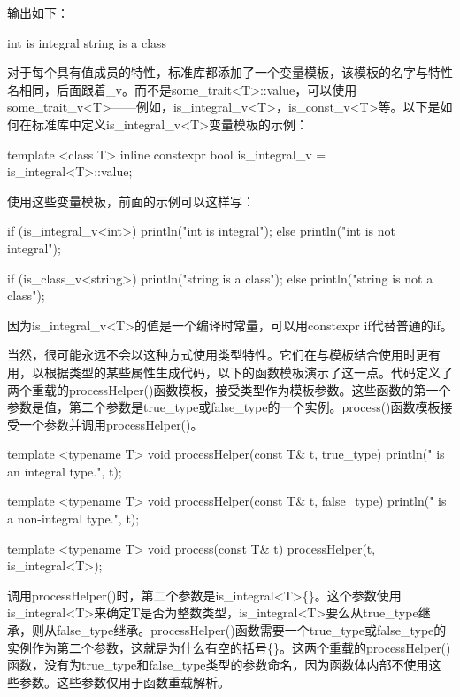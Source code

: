 输出如下：

\begin{shell}
int is integral
string is a class
\end{shell}

对于每个具有值成员的特性，标准库都添加了一个变量模板，该模板的名字与特性名相同，后面跟着\_v。而不是some\_trait<T>::value，可以使用some\_trait\_v<T>——例如，is\_integral\_v<T>，is\_const\_v<T>等。以下是如何在标准库中定义is\_integral\_v<T>变量模板的示例：

\begin{cpp}
template <class T>
inline constexpr bool is_integral_v = is_integral<T>::value;
\end{cpp}

使用这些变量模板，前面的示例可以这样写：

\begin{cpp}
if (is_integral_v<int>) { println("int is integral"); }
else { println("int is not integral"); }

if (is_class_v<string>) { println("string is a class"); }
else { println("string is not a class"); }
\end{cpp}

因为is\_integral\_v<T>的值是一个编译时常量，可以用constexpr if代替普通的if。

当然，很可能永远不会以这种方式使用类型特性。它们在与模板结合使用时更有用，以根据类型的某些属性生成代码，以下的函数模板演示了这一点。代码定义了两个重载的processHelper()函数模板，接受类型作为模板参数。这些函数的第一个参数是值，第二个参数是true\_type或false\_type的一个实例。process()函数模板接受一个参数并调用processHelper()。

\begin{cpp}
template <typename T>
void processHelper(const T& t, true_type)
{
    println("{} is an integral type.", t);
}

template <typename T>
void processHelper(const T& t, false_type)
{
    println("{} is a non-integral type.", t);
}

template <typename T>
void process(const T& t)
{
    processHelper(t, is_integral<T>{});
}
\end{cpp}

调用processHelper()时，第二个参数是is\_integral<T>\{\}。这个参数使用is\_integral<T>来确定T是否为整数类型，is\_integral<T>要么从true\_type继承，则从false\_type继承。processHelper()函数需要一个true\_type或false\_type的实例作为第二个参数，这就是为什么有空的括号\{\}。这两个重载的processHelper()函数，没有为true\_type和false\_type类型的参数命名，因为函数体内部不使用这些参数。这些参数仅用于函数重载解析。

